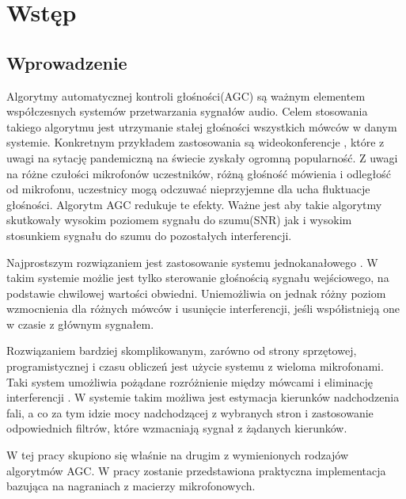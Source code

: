 \chapter{Wstęp}
\section{Wprowadzenie}

Algorytmy automatycznej kontroli głośności(AGC) są ważnym elementem współczesnych systemów przetwarzania sygnałów audio. Celem stosowania takiego algorytmu jest utrzymanie stałej głośności wszystkich mówców w danym systemie. Konkretnym przykładem zastosowania są wideokonferencje \cite{agc_application}, które z uwagi na sytację pandemiczną na świecie zyskały ogromną popularność. Z uwagi na różne czułości mikrofonów uczestników, różną głośność mówienia i odległość od mikrofonu, uczestnicy mogą odczuwać nieprzyjemne dla ucha fluktuacje głośności. Algorytm AGC redukuje te efekty. Ważne jest aby takie algorytmy skutkowały wysokim poziomem sygnału do szumu(SNR) jak i wysokim stosunkiem sygnału do szumu do pozostałych interferencji.

Najprostszym rozwiązaniem jest zastosowanie systemu jednokanałowego \cite{Archibald2008}. W takim systemie możlie jest tylko sterowanie głośnością sygnału wejściowego, na podstawie chwilowej wartości obwiedni. Uniemożliwia on jednak różny poziom wzmocnienia dla różnych mówców i usunięcie interferencji, jeśli współistnieją one w czasie z głównym sygnałem.

Rozwiązaniem bardziej skomplikowanym, zarówno od strony sprzętowej, programistycznej i czasu obliczeń jest użycie systemu z wieloma mikrofonami. Taki system umożliwia pożądane rozróżnienie między mówcami i eliminację interferencji \cite{Thiergart2013}. W systemie takim możliwa jest estymacja kierunków nadchodzenia fali, a co za tym idzie mocy nadchodzącej z wybranych stron i zastosowanie odpowiednich filtrów, które wzmacniają sygnał z żądanych kierunków.

W tej pracy skupiono się właśnie na drugim z wymienionych rodzajów algorytmów AGC. W pracy zostanie przedstawiona praktyczna implementacja bazująca na nagraniach z macierzy mikrofonowych.

